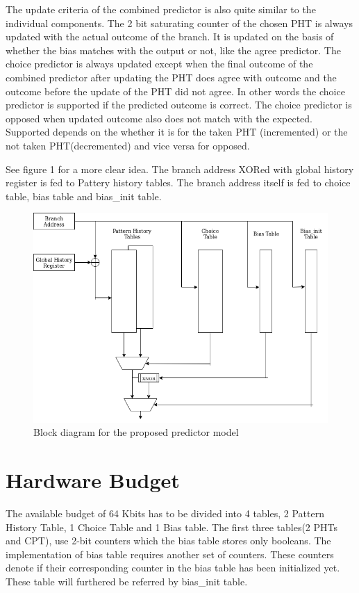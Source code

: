 \documentclass{sig-alternate}
\begin{document}
The update criteria of the combined predictor is also quite similar to the individual components. The 2 bit saturating counter of the chosen PHT is always updated with the actual outcome of the branch. It is updated on the basis of whether the bias matches with the output or not, like the agree predictor. The choice predictor is always updated except when the final outcome of the combined predictor after updating the PHT does agree with outcome and the outcome before the update of the PHT did not agree. In other words the choice predictor is supported if the predicted outcome is correct. The choice predictor is opposed when updated outcome also does not match with the expected. Supported depends on the whether it is for the taken PHT (incremented) or the not taken PHT(decremented) and vice versa for opposed. \par

See figure 1 for a more clear idea. The branch address XORed with global history register is fed to Pattery history tables. The branch address itself is fed to choice table, bias table and bias\_init table.

\begin{figure}[t]
    \centering
    \includegraphics[scale=0.35]{agree-bimode.png}
    \caption{Block diagram for the proposed predictor model}
    \label{fig:fig1}
\end{figure}

\section{Hardware Budget}

The available budget of 64 Kbits has to be divided into 4 tables, 2 Pattern History Table, 1 Choice Table and 1 Bias table. The first three tables(2 PHTs and CPT), use 2-bit counters which the bias table stores only booleans. The implementation of bias table requires another set of counters. These counters denote if their corresponding counter in the bias table has been initialized yet. These table will furthered be referred by bias\_init table. \par
\end{document}
